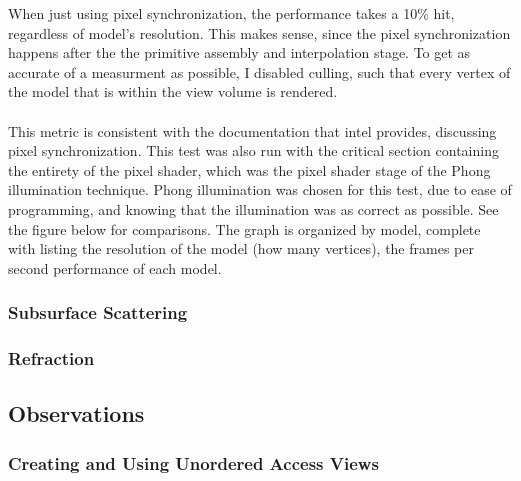 \documentclass[a4paper, 12pt]{article}
\begin{document}
When just using pixel synchronization, the performance takes a 10\% hit,
regardless of model's resolution. This makes sense, since the pixel
synchronization happens after the the primitive assembly and interpolation
stage. To get as accurate of a measurment as possible, I disabled culling,
such that every vertex of the model that is within the view volume is
rendered. \\ \\ This metric is consistent with the documentation that intel
provides, discussing pixel synchronization. This test was also run with the
critical section containing the entirety of the pixel shader, which was the
pixel shader stage of the Phong illumination technique. Phong illumination was
chosen for this test, due to ease of programming, and knowing that the
illumination was as correct as possible. See the figure below for comparisons.
The graph is organized by model, complete with listing the resolution of the
model (how many vertices), the frames per second performance of each model.

\subsubsection{Subsurface Scattering}

\lipsum[24-38]

\subsubsection{Refraction}

\lipsum[39-53]

\subsection{Observations}

\subsubsection{Creating and Using Unordered Access Views}
\label{section:UAVs}
\end{document}
